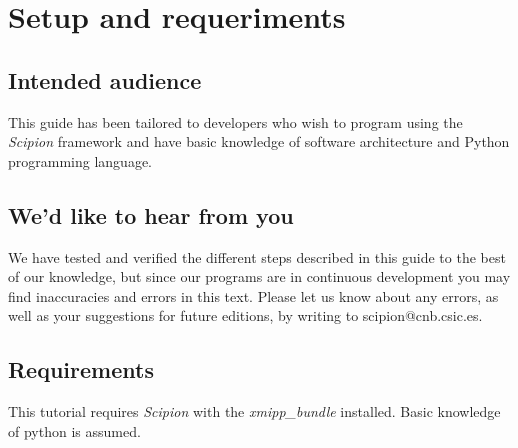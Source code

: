 \documentclass[12pt]{article} %
\def\scipion{\textit{Scipion}\xspace}
\begin{document}
\begin{versionhistory}
  
\end{versionhistory}\newpage


\tableofcontents %

\newpage %


\section{Setup and requeriments}
\subsection{Intended audience}
This guide has been tailored to developers who wish to program using the \scipion 
framework and have basic knowledge of software architecture and Python programming language. 

\subsection{We'd like to hear from you}

We have tested and verified the different steps described in this guide
to the best of our knowledge, but since our programs are in continuous
development you may find inaccuracies and errors in this text. Please
let us know about any errors, as well as your suggestions for
future editions, by writing to
scipion@cnb.csic.es.


\subsection{Requirements}

This tutorial requires \scipion with the \textit{xmipp\_bundle} installed. Basic knowledge of python is assumed.
\end{document}
